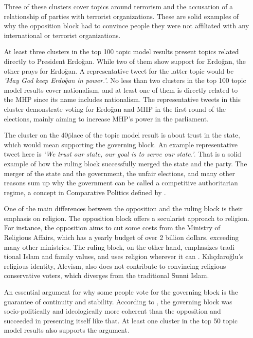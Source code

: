 Three of these clusters cover topics around terrorism and the accusation of a relationship of parties 
with terrorist organizations. These are solid examples of why the opposition block had to convince 
people they were not affiliated with any international or terrorist organizations. 

At least three clusters in the top 100 topic model results present topics related directly to 
President Erdo­ğan. While two of them show support for Erdo­ğan, the other prays for Erdo­ğan. A 
representative tweet for the latter topic would be \textit{'May God keep Erdo­ğan in power.'}. No 
less than two clusters in the top 100 topic model results cover nationalism, and at least one of them 
is directly related to the \ac{MHP} since its name includes nationalism. The representative tweets 
in this cluster demonstrate voting for Erdo­ğan and \ac{MHP} in the first round of the elections, 
mainly aiming to increase \ac{MHP}'s power in the parliament.

The cluster on the 40\. place of the topic model result is about trust in the state, which would 
mean supporting the governing block. An example representative tweet here is 
\textit{'We trust our state, our goal is to serve our state.'}. That is a solid example of how the 
ruling block successfully merged the state and the party. The merger of the state and the government, 
the unfair elections, and many other reasons sum up why the government can be called a competitive 
authoritarian regime, a concept in Comparative Politics defined by \textcite{levitsky_elections_2002}.

One of the main differences between the opposition and the ruling block is their emphasis on 
religion. The opposition block offers a secularist approach to religion. For instance, the opposition 
aims to cut some costs from the Ministry of Religious Affairs, which has a yearly budget of over 
2 billion dollars, exceeding many other ministries. The ruling block, on the other hand, emphasizes 
tradi­tional Islam and family values, and uses religion wherever it can 
\parencite{cevik_aksoy_aydin_turkey_after_elections_2023}. Kılıçdaroğlu's religious identity, 
Alevism, also does not contribute to convincing religious conservative voters, which diverges 
from the traditional Sunni Islam.

An essential argument for why some people vote for the governing block is the guarantee of continuity 
and stability. According to \textcite{cevik_aksoy_aydin_turkey_after_elections_2023}, the governing 
block was socio-politically and ideologically more coherent than the oppo­sition and succeeded 
in presenting itself like that. At least one cluster in the top 50 topic model results also 
supports the argument.

